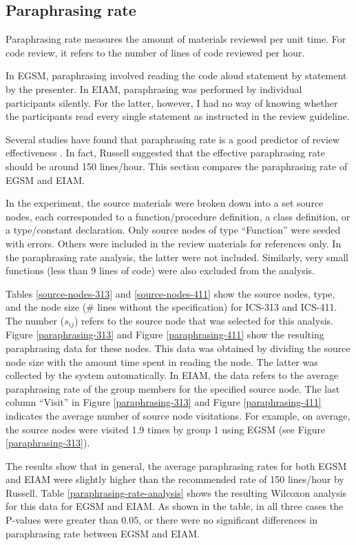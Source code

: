 \subsection {Paraphrasing rate}
\label{sec:paraphrasing-rate}
Paraphrasing rate measures the amount of materials reviewed per
unit time. For code review, it refers to the number of lines of code
reviewed per hour.

In EGSM, paraphrasing involved reading the code aloud statement by
statement by the 
presenter.  In EIAM, paraphrasing was performed by individual participants
silently. For the latter, however, I had no way of knowing
whether the participants read every single statement as instructed
in the review guideline. 

Several studies have found that paraphrasing rate is 
a good predictor of review effectiveness
\cite{Russell91,Humphrey90,Christenson92}. In fact, 
Russell suggested that the effective paraphrasing rate should be
around 150 lines/hour.
This section compares the paraphrasing rate of EGSM and EIAM.

In the experiment, the source materials were broken down
into a set source nodes, each corresponded to a function/procedure
definition, a class definition, or a type/constant declaration.
Only source nodes of type ``Function'' were seeded with
errors. Others were included in the review materials for references
only.  
In the paraphrasing rate analysis, the latter were not included.
Similarly, very small functions
(less than 9 lines of code) were also excluded from the analysis.

Tables \ref{source-nodes-313} and \ref{source-nodes-411}
show the source nodes, type, and the node size (\# lines without the
specification) for ICS-313 and ICS-411. 
The number ($s_{ij}$) refers to the source node that was selected for
this analysis. Figure \ref{paraphrasing-313} and Figure
\ref{paraphrasing-411} show the resulting paraphrasing data
for these nodes.
This data was obtained by dividing the source node size with the
amount time spent in reading the node. The latter
was collected by the system automatically.
In EIAM, the data refers to the average paraphrasing rate
of the group members for the specified source node.
The last column ``Visit'' in Figure \ref{paraphrasing-313} and Figure
\ref{paraphrasing-411} indicates the average number of source node
visitations. For example, on average, the source nodes were
visited 1.9 times by group 1 using EGSM (see Figure
\ref{paraphrasing-313}).

The results show that in general, the average paraphrasing rates for
both EGSM and EIAM were 
slightly higher than the recommended rate of 150 lines/hour by Russell.
Table \ref{paraphrasing-rate-analysis} shows the resulting Wilcoxon
analysis for this data for EGSM and EIAM. As shown in the table, in all
three cases the P-values were  
greater than 0.05, or there were no significant differences in
paraphrasing rate between EGSM and EIAM. 

